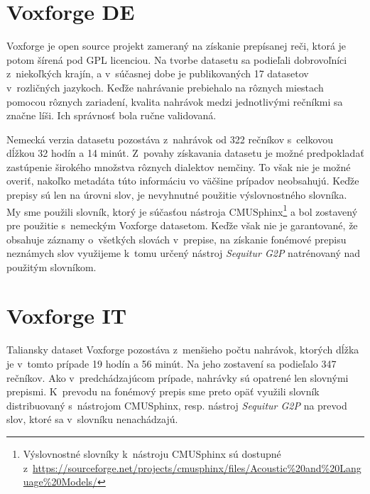\section{Voxforge DE} \label{sec:voxforge_de}

Voxforge \cite{Voxforge} je open source projekt zameraný na získanie prepísanej reči, ktorá je potom šírená pod GPL licenciou. Na tvorbe datasetu sa podieľali dobrovoľníci z~niekoľkých krajín, a v~súčasnej dobe je publikovaných 17 datasetov v~rozličných jazykoch. Keďže nahrávanie prebiehalo na rôznych miestach pomocou rôznych zariadení, kvalita nahrávok medzi jednotlivými rečníkmi sa značne líši. Ich správnosť bola ručne validovaná.

Nemecká verzia datasetu pozostáva z~nahrávok od 322 rečníkov s~celkovou dĺžkou 32 hodín a 14 minút. Z~povahy získavania datasetu je možné predpokladať zastúpenie širokého množstva rôznych dialektov nemčiny. To však nie je možné overiť, nakoľko metadáta túto informáciu vo väčšine prípadov neobsahujú. Keďže prepisy sú len na úrovni slov, je nevyhnutné použitie výslovnostného slovníka. My sme použili slovník, ktorý je súčasťou nástroja CMUSphinx\footnote{Výslovnostné slovníky k~nástroju CMUSphinx sú dostupné z~\url{https://sourceforge.net/projects/cmusphinx/files/Acoustic\%20and\%20Language\%20Models/}} a bol zostavený pre použitie s~nemeckým Voxforge datasetom. Keďže však nie je garantované, že obsahuje záznamy o~všetkých slovách v~prepise, na získanie fonémové prepisu neznámych slov využijeme k~tomu určený nástroj \textit{Sequitur G2P} \cite{Bisani2008} natrénovaný nad použitým slovníkom. 

\section{Voxforge IT} \label{sec:voxforge_it}

Taliansky dataset Voxforge pozostáva z~menšieho počtu nahrávok, ktorých dĺžka je v~tomto prípade 19 hodín a 56 minút. Na jeho zostavení sa podieľalo 347 rečníkov. Ako v~predchádzajúcom prípade, nahrávky sú opatrené len slovnými prepismi. K~prevodu na fonémový prepis sme preto opäť využili slovník distribuovaný s~nástrojom CMUSphinx\footnotemark[\value{footnote}], resp. nástroj \textit{Sequitur G2P} na prevod slov, ktoré sa v~slovníku nenachádzajú.